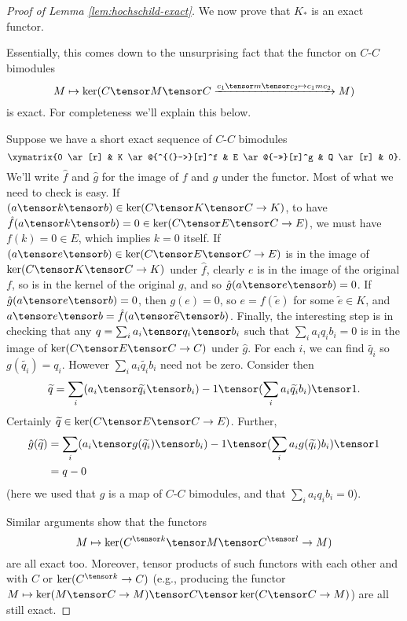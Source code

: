 \begin{proof}[Proof of Lemma \ref{lem:hochschild-exact}]
We now prove that $K_*$ is an exact functor.

Essentially, this comes down to the unsurprising fact that the functor on $C$-$C$ bimodules
\begin{equation*}
M \mapsto \ker(C \tensor M \tensor C \xrightarrow{c_1 \tensor m \tensor c_2 \mapsto c_1 m c_2} M)
\end{equation*}
is exact. For completeness we'll explain this below.

Suppose we have a short exact sequence of $C$-$C$ bimodules $$\xymatrix{0 \ar[r] & K \ar@{^{(}->}[r]^f & E \ar@{->>}[r]^g & Q \ar[r] & 0}.$$
We'll write $\hat{f}$ and $\hat{g}$ for the image of $f$ and $g$ under the functor.
Most of what we need to check is easy.
If $(a \tensor k \tensor b) \in \ker(C \tensor K \tensor C \to K)$, to have $\hat{f}(a \tensor k \tensor b) = 0 \in \ker(C \tensor E \tensor C \to E)$, we must have $f(k) = 0 \in E$, which implies $k=0$ itself. If $(a \tensor e \tensor b) \in \ker(C \tensor E \tensor C \to E)$ is in the image of $\ker(C \tensor K \tensor C \to K)$ under $\hat{f}$, clearly
$e$ is in the image of the original $f$, so is in the kernel of the original $g$, and so $\hat{g}(a \tensor e \tensor b) = 0$.
If $\hat{g}(a \tensor e \tensor b) = 0$, then $g(e) = 0$, so $e = f(\widetilde{e})$ for some $\widetilde{e} \in K$, and $a \tensor e \tensor b = \hat{f}(a \tensor \widetilde{e} \tensor b)$.
Finally, the interesting step is in checking that any $q = \sum_i a_i \tensor q_i \tensor b_i$ such that $\sum_i a_i q_i b_i = 0$ is in the image of $\ker(C \tensor E \tensor C \to C)$ under $\hat{g}$.
For each $i$, we can find $\widetilde{q_i}$ so $g(\widetilde{q_i}) = q_i$. However $\sum_i a_i \widetilde{q_i} b_i$ need not be zero.
Consider then $$\widetilde{q} = \sum_i (a_i \tensor \widetilde{q_i} \tensor b_i) - 1 \tensor (\sum_i a_i \widetilde{q_i} b_i) \tensor 1.$$ Certainly
$\widetilde{q} \in \ker(C \tensor E \tensor C \to E)$. Further,
\begin{align*}
\hat{g}(\widetilde{q}) & = \sum_i (a_i \tensor g(\widetilde{q_i}) \tensor b_i) - 1 \tensor (\sum_i a_i g(\widetilde{q_i}) b_i) \tensor 1 \\
                       & = q - 0
\end{align*}
(here we used that $g$ is a map of $C$-$C$ bimodules, and that $\sum_i a_i q_i b_i = 0$).

Similar arguments show that the functors
\begin{equation}
\label{eq:ker-functor}%
M \mapsto \ker(C^{\tensor k} \tensor M \tensor C^{\tensor l} \to M)
\end{equation}
are all exact too. Moreover, tensor products of such functors with each
other and with $C$ or $\ker(C^{\tensor k} \to C)$ (e.g., producing the functor $M \mapsto \ker(M \tensor C \to M)
\tensor C \tensor \ker(C \tensor C \to M)$) are all still exact.


\end{proof}
